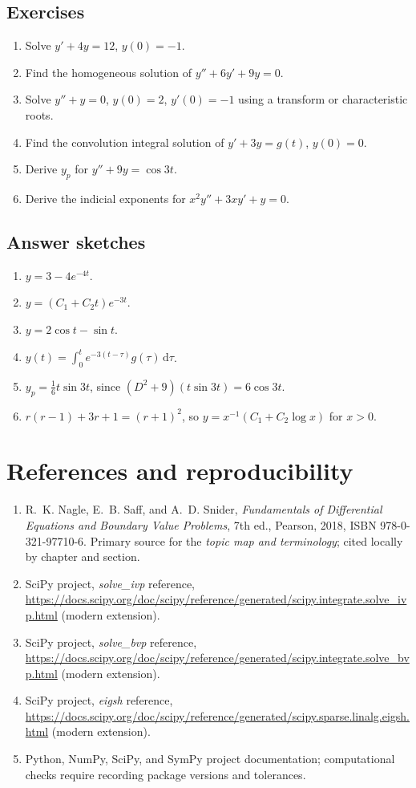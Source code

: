 \documentclass[11pt,letterpaper,oneside]{report}
\theoremstyle{definition}\newtheorem{definition}[theorem]{Definition}
\theoremstyle{remark}\newtheorem{remark}[theorem]{Remark}
\newcommand{\dd}{\,\mathrm{d}}
\begin{document}
\section{Exercises}
\begin{enumerate}
\item Solve $y'+4y=12$, $y(0)=-1$.
\item Find the homogeneous solution of $y''+6y'+9y=0$.
\item Solve $y''+y=0$, $y(0)=2$, $y'(0)=-1$ using a transform or characteristic roots.
\item Find the convolution integral solution of $y'+3y=g(t)$, $y(0)=0$.
\item Derive $y_p$ for $y''+9y=\cos 3t$.
\item Derive the indicial exponents for $x^2y''+3xy'+y=0$.
\end{enumerate}
\section{Answer sketches}
\begin{enumerate}
\item $y=3-4e^{-4t}$.
\item $y=(C_1+C_2 t)e^{-3t}$.
\item $y=2\cos t-\sin t$.
\item $y(t)=\int_0^t e^{-3(t-\tau)}g(\tau)\dd\tau$.
\item $y_p=\tfrac16t\sin3t$, since $(D^2+9)(t\sin3t)=6\cos3t$.
\item $r(r-1)+3r+1=(r+1)^2$, so $y=x^{-1}(C_1+C_2\log x)$ for $x>0$.
\end{enumerate}

\appendix
\chapter{References and reproducibility}
\begin{enumerate}
\item R.~K. Nagle, E.~B. Saff, and A.~D. Snider, \emph{Fundamentals of Differential Equations and Boundary Value Problems}, 7th ed., Pearson, 2018, ISBN 978-0-321-97710-6. Primary source for the \emph{topic map and terminology}; cited locally by chapter and section.
\item SciPy project, \emph{solve\_ivp} reference, \url{https://docs.scipy.org/doc/scipy/reference/generated/scipy.integrate.solve_ivp.html} (modern extension).
\item SciPy project, \emph{solve\_bvp} reference, \url{https://docs.scipy.org/doc/scipy/reference/generated/scipy.integrate.solve_bvp.html} (modern extension).
\item SciPy project, \emph{eigsh} reference, \url{https://docs.scipy.org/doc/scipy/reference/generated/scipy.sparse.linalg.eigsh.html} (modern extension).
\item Python, NumPy, SciPy, and SymPy project documentation; computational checks require recording package versions and tolerances.
\end{enumerate}
\end{document}
